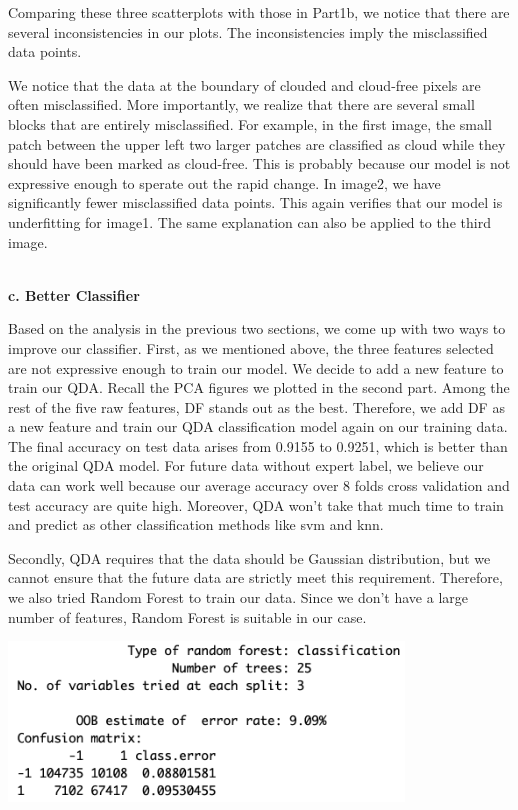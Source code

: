 \documentclass[11pt]{article}
\begin{document}
Comparing these three scatterplots with those in Part1b, we notice that there are several inconsistencies in our plots. The inconsistencies imply the misclassified data points. 

We notice that the data at the boundary of clouded and cloud-free pixels are often misclassified. More importantly, we realize that there are several small blocks that are entirely misclassified. For example, in the first image, the small patch between the upper left two larger patches are classified as cloud while they should have been marked as cloud-free. This is probably because our model is not expressive enough to sperate out the rapid change. In image2, we have significantly fewer misclassified data points. This again verifies that our model is underfitting for image1. The same explanation can also be applied to the third image.


\vspace{0.3cm}
\mbox{}\\
\textbf{c. Better Classifier}

Based on the analysis in the previous two sections, we come up with two ways to improve our classifier.
First, as we mentioned above, the three features selected are not expressive enough to train our model. We decide to add a new feature to train our QDA. Recall the PCA figures we plotted in the second part. Among the rest of the five raw features, DF stands out as the best. Therefore, we add DF as a new feature and train our QDA classification model again on our training data. The final accuracy on test data arises from 0.9155 to 0.9251, which is better than the original QDA model. For future data without expert label, we believe our data can work well because our average accuracy over 8 folds cross validation and test accuracy are quite high. Moreover, QDA won't take that much time to train and predict as other classification methods like svm and knn.

Secondly, QDA requires that the data should be Gaussian distribution, but we cannot ensure that the future data are strictly meet this requirement. Therefore, we also tried Random Forest to train our data. Since we don't have a large number of features, Random Forest is suitable in our case.

\includegraphics[width = 10.5cm]{4(c)RandomForest}
\end{document}
